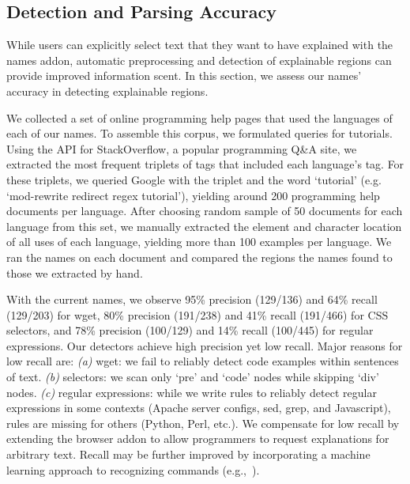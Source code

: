 \subsection{Detection and Parsing Accuracy}
\begin{changes}
While users can explicitly select text that they want to have explained with the \Glspl{name} addon, automatic preprocessing and detection of explainable regions can provide improved information scent.
In this section, we assess our \Glspl{name}' accuracy in detecting explainable regions.

We collected a set of online programming help pages that used the languages of each of our \Glspl{name}.
To assemble this corpus, we formulated queries for tutorials.
Using the API for StackOverflow, a popular programming Q\&A site, we extracted the most frequent triplets of tags that included each language's tag.
For these triplets, we queried Google with the triplet and the word `tutorial' (e.g. `mod-rewrite redirect regex tutorial'), yielding around 200 programming help documents per language. %
After choosing random sample of 50 documents for each language from this set, 
we manually extracted the element and character location of all uses of each language, yielding more than 100 examples per language.
We ran the \Glspl{name} on each document and compared the regions the \Glspl{name} found to those we extracted by hand.

With the current \Glspl{name}, we observe 95\% precision (129/136) and 64\% recall (129/203) for wget, 80\% precision (191/238) and 41\% recall (191/466) for CSS selectors, and 78\% precision (100/129) and 14\% recall (100/445) for regular expressions.
Our detectors achieve high precision yet low recall.
Major reasons for low recall are:
\emph{(a)} wget: we fail to reliably detect code examples within sentences of text.
\emph{(b)} selectors: we scan only `pre' and `code' nodes while skipping `div' nodes.
\emph{(c)} regular expressions: while we write rules to reliably detect regular expressions in some contexts (Apache server configs, sed, grep, and Javascript), rules are missing for others (Python, Perl, etc.).
We compensate for low recall by extending the browser addon to allow programmers to request explanations for arbitrary text.
Recall may be further improved by incorporating a machine learning approach to recognizing commands (e.g.,~\cite{pavel_browsing_2013}).


\end{changes}
